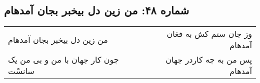 \begin{center}
\section*{شماره ۴۸: من زین دل بیخبر بجان آمدهام}
\label{sec:048}
\begin{longtable}{l p{0.5cm} r}
من زین دل بیخبر بجان آمدهام
&&
وز جان ستم کش به فغان آمدهام
\\
چون کار جهان با من و بی من یک سانسْت
&&
پس من به چه کاردر جهان آمدهام
\\
\end{longtable}
\end{center}
